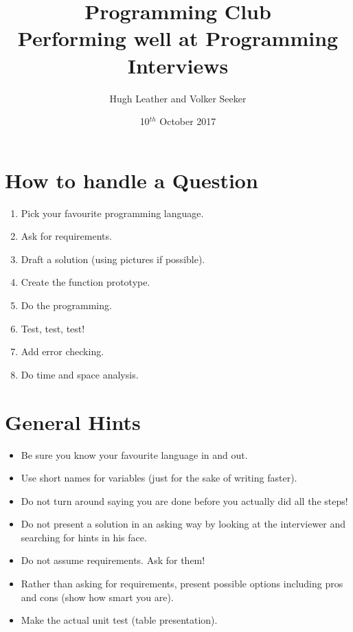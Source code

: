 \documentclass{article}
\title{
    \textbf{Programming Club}\\
    Performing well at Programming Interviews
}
\author{Hugh Leather and Volker Seeker}
\date{10$^{th}$ October 2017}
\begin{document}
    \maketitle
   
    \section{How to handle a Question}

    \begin{enumerate}
        \item Pick your favourite programming language.
        \item Ask for requirements.
        \item Draft a solution (using pictures if possible).
        \item Create the function prototype.
        \item Do the programming.
        \item Test, test, test!
        \item Add error checking.
        \item Do time and space analysis.
    \end{enumerate}

    \section{General Hints}

    \begin{itemize}
        \item Be sure you know your favourite language in and out.
        \item Use short names for variables (just for the sake of writing faster).
        \item Do not turn around saying you are done before you actually did all the steps!
        \item Do not present a solution in an asking way by looking at the
            interviewer and searching for hints in his face.
        \item Do not assume requirements. Ask for them!
        \item Rather than asking for requirements, present possible options including
            pros and cons (show how smart you are).
        \item Make the actual unit test (table presentation).
    \end{itemize}
\end{document}
